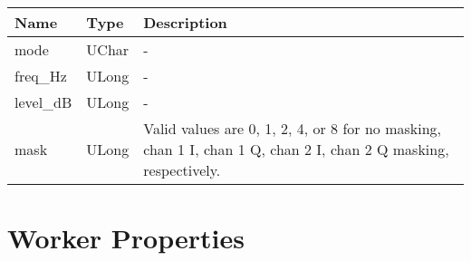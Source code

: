 \documentclass{article}
\begin{document}
\begin{landscape}
\begin{scriptsize}
			\begin{tabular}{|p{4.7cm}|p{2.7cm}|p{13.77cm}|} \hline \cellcolor{blue} Name & \cellcolor{blue}Type & \cellcolor{blue}Description\\ \hline mode & UChar & - \\ \hline freq\_Hz & ULong & -\\ \hline level\_dB & ULong & -\\ \hline mask & ULong & Valid values are 0, 1, 2, 4, or 8 for no masking, chan 1 I, chan 1 Q, chan 2 I, chan 2 Q masking, respectively.\\ \hline\end{tabular}
				\end{scriptsize}
				\pagebreak
	\section*{Worker Properties}

\end{landscape}
\end{document}
